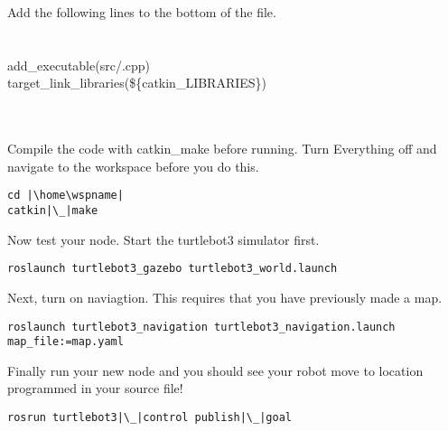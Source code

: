 \documentclass[12pt]{article}
\begin{document}
\begin{description}[labelindent=1cm]
\vspace{5mm}Add the following lines to the bottom of the file. \\
\underline{\hspace{155mm}}\\\\
{\selectfont add\_executable(\nodname\hspace{3mm}src/\nodname.cpp) } \\
{\selectfont target\_link\_libraries(\nodname \hspace{3mm}\$\{catkin\_LIBRARIES\}) } \vspace{2mm}\\
\underline{\hspace{155mm}}\\\\


\item Compile the code with catkin\_make before running. Turn Everything off and navigate to the workspace before you do this.\\
\begin{verbatim}
cd |\home\wspname|
catkin|\_|make
\end{verbatim}

\item Now test your node. Start the turtlebot3 simulator first. 
 
\begin{verbatim}
roslaunch turtlebot3_gazebo turtlebot3_world.launch
\end{verbatim}

\item Next, turn on naviagtion. This requires that you have previously made a map.
 
\begin{verbatim}
roslaunch turtlebot3_navigation turtlebot3_navigation.launch map_file:=map.yaml
\end{verbatim}

\item Finally run your new node and you should see your robot move to location programmed in your source file!

\begin{verbatim}
rosrun turtlebot3|\_|control publish|\_|goal
\end{verbatim}


\end{description}
\end{document}
